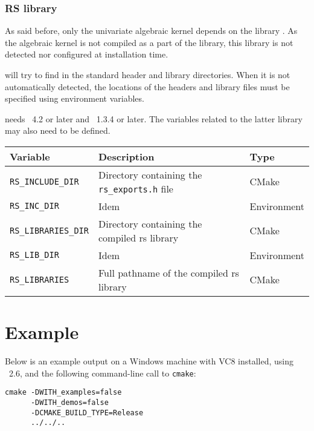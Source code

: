 \subsubsection{RS library}

As said before, only the \cgal{} univariate algebraic kernel depends on the
library \rs. As the algebraic kernel is not compiled as a part of the \cgal{}
library, this library is not detected nor configured at installation time.

\cmake{} will try to find \rs{} in the standard header and library
directories. When it is not automatically detected, the locations of the
headers and library files must be specified using environment variables.

\rs{} needs \gmp~4.2 or later and \mpfi~1.3.4 or later. The variables
related to the latter library may also need to be defined.

{\ccTexHtml{\small}{}
\renewcommand{\arraystretch}{1.3}
\gdef\lcTabularBorder{2}
\begin{tabular}{|l|l|l|} \hline
  \textbf{Variable}             & \textbf{Description}                                  & \textbf{Type}\\\hline\hline
  \texttt{RS\_INCLUDE\_DIR}     & Directory containing the \texttt{rs\_exports.h} file  & CMake\\\hline
  \texttt{RS\_INC\_DIR}         & Idem                                                  & Environment\\\hline
  \texttt{RS\_LIBRARIES\_DIR}   & Directory containing the compiled rs library          & CMake\\\hline
  \texttt{RS\_LIB\_DIR}         & Idem                                                  & Environment\\\hline
  \texttt{RS\_LIBRARIES}        & Full pathname of the compiled rs library              & CMake\\\hline
\end{tabular}
}

\section{Example} 

Below is an example output on a Windows machine with VC8 installed, using \cmake\ 2.6,
and the following command-line call to \texttt{cmake}:

{\ccTexHtml{\scriptsize}{}
\begin{verbatim}
cmake -DWITH_examples=false 
      -DWITH_demos=false 
      -DCMAKE_BUILD_TYPE=Release 
      ../../..
\end{verbatim}
}


